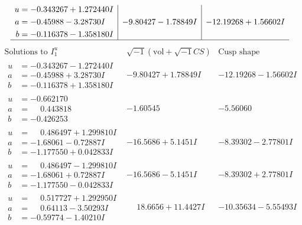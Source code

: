 \documentclass[1p]{elsarticle_modified}
\theoremstyle{definition}
\newcommand{\I}{\sqrt{-1}}
\begin{document}
$$\begin{array}{c|c|c}
\begin{aligned}
u &= -0.343267 + 1.272440 I \\
a &= -0.45988 - 3.28730 I \\
b &= -0.116378 - 1.358180 I\end{aligned}
 & -9.80427 - 1.78849 I & -12.19268 + 1.56602 I\\
 \hline 
 \end{array}$$\newpage$$\begin{array}{c|c|c}  
\text{Solutions to }I^u_{1}& \I (\text{vol} + \sqrt{-1}CS) & \text{Cusp shape}\\
 \hline 
\begin{aligned}
u &= -0.343267 - 1.272440 I \\
a &= -0.45988 + 3.28730 I \\
b &= -0.116378 + 1.358180 I\end{aligned}
 & -9.80427 + 1.78849 I & -12.19268 - 1.56602 I \\ \hline\begin{aligned}
u &= -0.662170\phantom{ +0.000000I} \\
a &= \phantom{-}0.443818\phantom{ +0.000000I} \\
b &= -0.426253\phantom{ +0.000000I}\end{aligned}
 & -1.60545\phantom{ +0.000000I} & -5.56060\phantom{ +0.000000I} \\ \hline\begin{aligned}
u &= \phantom{-}0.486497 + 1.299810 I \\
a &= -1.68061 - 0.72887 I \\
b &= -1.177550 + 0.042833 I\end{aligned}
 & -16.5686 + 5.1451 I & -8.39302 - 2.77801 I \\ \hline\begin{aligned}
u &= \phantom{-}0.486497 - 1.299810 I \\
a &= -1.68061 + 0.72887 I \\
b &= -1.177550 - 0.042833 I\end{aligned}
 & -16.5686 - 5.1451 I & -8.39302 + 2.77801 I \\ \hline\begin{aligned}
u &= \phantom{-}0.517727 + 1.292950 I \\
a &= \phantom{-}0.64113 - 3.50293 I \\
b &= -0.59774 - 1.40210 I\end{aligned}
 & \phantom{-}18.6656 + 11.4427 I & -10.35634 - 5.55493 I \\ \hline\begin{aligned}

\end{aligned}
\end{array}$$
\end{document}
